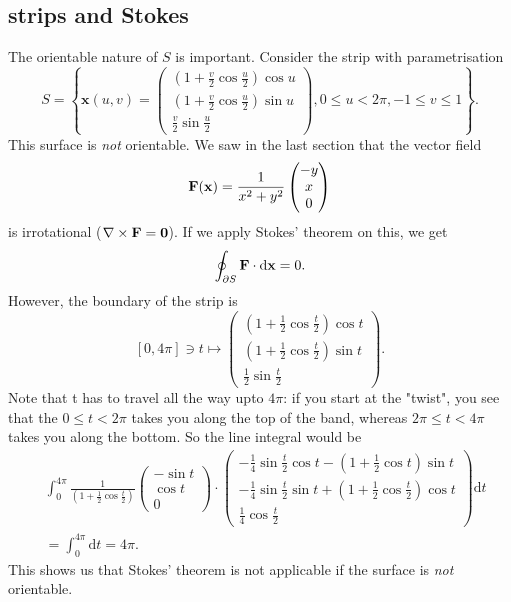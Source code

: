 \subsection{\mobius strips and Stokes}
The orientable nature of $S$ is important. Consider the \mobius strip with parametrisation
\[
    S=\left\{\mathbf{x}(u, v)=\begin{pmatrix}
        \left(1+\frac{v}{2} \cos \frac{u}{2}\right) \cos u \\[5pt]
        \left(1+\frac{v}{2} \cos \frac{u}{2}\right) \sin u \\[5pt]
        \frac{v}{2} \sin \frac{u}{2}
    \end{pmatrix}, 0 \leq u<2 \pi,-1 \leq v \leq 1\right\}.
\]
This surface is \textit{not} orientable. We saw in the last section that the vector field
\[
    {\bf F}({\bf x}) = \frac{1}{x^2+y^2}\begin{pmatrix}
        -y \\ x \\ 0
    \end{pmatrix}
\]
is irrotational ($ \nabla\times {\bf F} = \mathbf{0} $). If we apply Stokes' theorem on this, we get 
\[
    \oint_{\partial S} {\bf F} \cdot \mathrm{d}{\bf x}=0.
\]
However, the boundary of the \mobius strip is 
\[
    [0,4 \pi] \ni t \mapsto \begin{pmatrix}
        \left(1+\frac{1}{2} \cos \frac{t}{2}\right) \cos t \\[5pt]
        \left(1+\frac{1}{2} \cos \frac{t}{2}\right) \sin t \\[5pt]
        \frac{1}{2} \sin \frac{t}{2}
    \end{pmatrix}.
\]
Note that t has to travel all the way upto $4 \pi$: if you start at the "twist", you see that the
$0 \leq t<2 \pi$ takes you along the top of the band, whereas $2 \pi \leq t<4 \pi$ takes you along the bottom. So the line integral would be 
\begin{align*}
    &\int_{0}^{4 \pi} \frac{1}{\left(1+\frac{1}{2} \cos \frac{t}{2}\right)}\begin{pmatrix}
        -\sin t \\ \cos t \\ 0
    \end{pmatrix} \cdot \begin{pmatrix}
        -\frac{1}{4} \sin \frac{t}{2} \cos t-\left(1+\frac{1}{2} \cos t\right) \sin t \\[5pt]
        -\frac{1}{4} \sin \frac{t}{2} \sin t+\left(1+\frac{1}{2} \cos \frac{t}{2}\right) \cos t \\[5pt]
        \frac{1}{4} \cos \frac{t}{2}
    \end{pmatrix} \mathrm{d} t\\
    &=\int_{0}^{4 \pi} \mathrm{d} t=4 \pi.
\end{align*}
This shows us that Stokes' theorem is not applicable if the surface is \textit{not} orientable.

